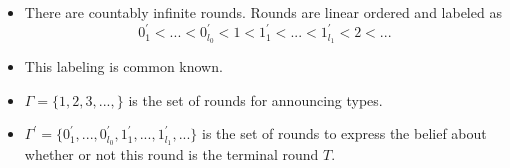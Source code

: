 \documentclass[9pt,handout]{beamer}
\begin{document}
\begin{frame}
\begin{center}
\end{center}
\begin{itemize}
\item There are countably infinite  rounds. Rounds are linear ordered and labeled as \[0^{'}_1<...<0^{'}_{l_0}<1<1^{'}_{1}<...<1^{'}_{l_1}<2<...\]
\item This labeling is common known.
\item $\Gamma=\{1,2,3,...,\}$ is the set of rounds for announcing types.
\item $\Gamma^{'}=\{0^{'}_1,...,0^{'}_{l_0},1^{'}_{1},...,1^{'}_{l_1},...\}$ is the set of rounds to express the belief about whether or not this round is the terminal round $T$. 
\end{itemize}
\end{frame}
\end{document}

